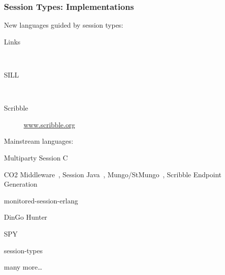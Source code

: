 
\begin{frame}\frametitle{Session Types: Implementations}
New languages guided by session types:
\begin{description}
\item [Links]~\cite{lindleylightweight}
\item [SILL]~\cite{pfenning2015}
\item [Scribble] \url{www.scribble.org}
\end{description}

Mainstream languages:
\begin{description}
\item [C] Multiparty Session C~\cite{ng12}
\item [Java] CO2 Middleware~\cite{Bartoletti2015}, Session Java~\cite{hu08}, Mungo/StMungo~\cite{kouzapas16}, Scribble Endpoint Generation~\cite{hu16}
\item [Erlang] monitored-session-erlang~\cite{fowler}
\item [Go] DinGo Hunter~\cite{dingo}
\item [Python] SPY~\cite{Neykova2013}
\item [Rust] session-types~\cite{rust}
\item many more\ldots
\end{description}

\end{frame}
